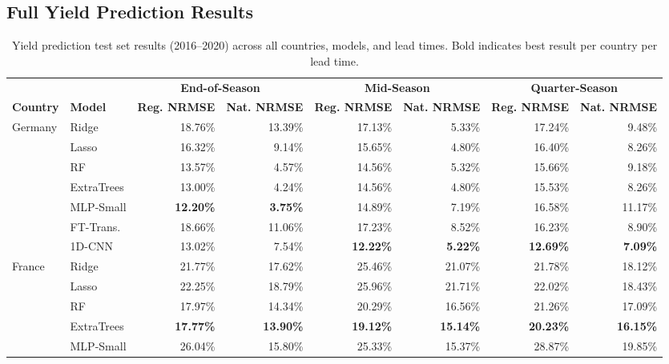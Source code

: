 \documentclass[pdflatex,sn-mathphys-num, oneside, 11pt]{sn-jnl}%
\theoremstyle{thmstyleone}%
\theoremstyle{thmstyletwo}%
\theoremstyle{thmstylethree}%
\begin{document}
\begin{appendices}
\section{Full Yield Prediction Results}\label{app:yield_full}

\begin{table}[ht!]
\centering
\caption{Yield prediction test set results (2016--2020) across all countries, models, and lead times. Bold indicates best result per country per lead time.}
\label{tab:yield_full}
\small
\setlength{\tabcolsep}{5pt}
\begin{tabular}{ll rr rr rr}
\toprule
& & \multicolumn{2}{c}{\textbf{End-of-Season}} & \multicolumn{2}{c}{\textbf{Mid-Season}} & \multicolumn{2}{c}{\textbf{Quarter-Season}} \\
\cmidrule(lr){3-4} \cmidrule(lr){5-6} \cmidrule(lr){7-8}
\textbf{Country} & \textbf{Model} & \textbf{Reg. NRMSE} & \textbf{Nat. NRMSE} & \textbf{Reg. NRMSE} & \textbf{Nat. NRMSE} & \textbf{Reg. NRMSE} & \textbf{Nat. NRMSE} \\
\midrule
\multirow{7}{*}{Germany}
& Ridge        & 18.76\% & 13.39\% & 17.13\% &  5.33\% & 17.24\% &  9.48\% \\
& Lasso        & 16.32\% &  9.14\% & 15.65\% &  4.80\% & 16.40\% &  8.26\% \\
& RF           & 13.57\% &  4.57\% & 14.56\% &  5.32\% & 15.66\% &  9.18\% \\
& ExtraTrees   & 13.00\% &  4.24\% & 14.56\% &  4.80\% & 15.53\% &  8.26\% \\
\cmidrule(lr){2-8}
& MLP-Small    & \textbf{12.20\%} & \textbf{3.75\%} & 14.89\% &  7.19\% & 16.58\% & 11.17\% \\
& FT-Trans.    & 18.66\% & 11.06\% & 17.23\% &  8.52\% & 16.23\% &  8.90\% \\
& 1D-CNN       & 13.02\% &  7.54\% & \textbf{12.22\%} & \textbf{5.22\%} & \textbf{12.69\%} & \textbf{7.09\%} \\
\midrule
\multirow{7}{*}{France}
& Ridge        & 21.77\% & 17.62\% & 25.46\% & 21.07\% & 21.78\% & 18.12\% \\
& Lasso        & 22.25\% & 18.79\% & 25.96\% & 21.71\% & 22.02\% & 18.43\% \\
& RF           & 17.97\% & 14.34\% & 20.29\% & 16.56\% & 21.26\% & 17.09\% \\
& ExtraTrees   & \textbf{17.77\%} & \textbf{13.90\%} & \textbf{19.12\%} & \textbf{15.14\%} & \textbf{20.23\%} & \textbf{16.15\%} \\
\cmidrule(lr){2-8}
& MLP-Small    & 26.04\% & 15.80\% & 25.33\% & 15.37\% & 28.87\% & 19.85\% \\

\end{tabular}
\end{table}
\end{appendices}
\end{document}
